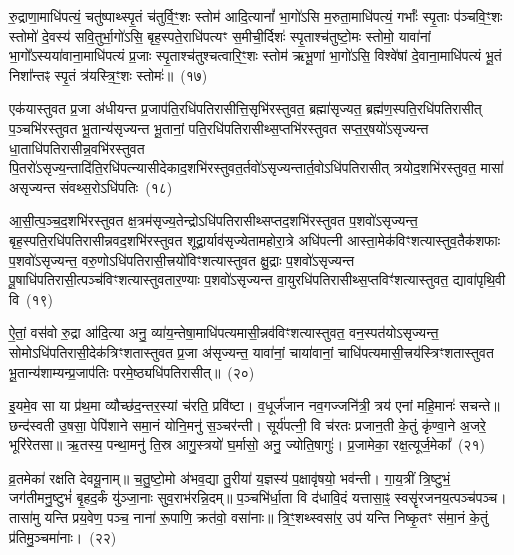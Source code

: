 रु॒द्राणा॒माधि॑पत्यं॒ चतु॑ष्पाथ्स्पृ॒तं च॑तुर्वि॒ꣳ॒शः स्तोम॑ आदि॒त्यानां᳚ भा॒गो॑\-ऽसि म॒रुता॒माधि॑पत्यं॒ गर्भाः᳚ स्पृ॒ताः प॑ञ्चवि॒ꣳ॒शः स्तोमो॑ दे॒वस्य॑ सवि॒तुर्भा॒गो॑\-ऽसि॒ बृह॒स्पते॒राधि॑पत्यꣳ स॒मीची॒र्दिशः॑ स्पृ॒ताश्च॑तुष्टो॒मः स्तोमो॒ यावा॑नां भा॒गो᳚\-ऽस्यया॑वाना॒माधि॑पत्यं प्र॒जाः स्पृ॒ताश्च॑तुश्चत्वारि॒ꣳ॒शः स्तोम॑ ऋभू॒णां भा॒गो॑\-ऽसि॒ विश्वे॑षां दे॒वाना॒माधि॑पत्यं भू॒तं निशा᳚न्तꣴ स्पृ॒तं त्र॑यस्त्रि॒ꣳ॒शः स्तोमः॑॥~(१७)

{\anuvakamend[{वसू॑नां भा॒गो॑\-ऽसि॒ षट्च॑त्वारिꣳशच्च}]}%

एक॑यास्तुवत प्र॒जा अ॑धीयन्त प्र॒जा\-प॑ति॒रधि॑पतिरासीत्ति॒सृभि॑रस्तुवत॒ ब्रह्मा॑सृज्यत॒ ब्रह्म॑ण॒स्पति॒रधि॑पतिरासीत् प॒ञ्चभि॑रस्तुवत भू॒तान्य॑सृज्यन्त भू॒तानां॒ पति॒रधि॑पतिरासीथ्स॒प्तभि॑रस्तुवत सप्त॒र्॒\mbox{}षयो॑\-ऽसृज्यन्त धा॒ताधि॑पतिरा\-सीन्न॒वभि॑रस्तुवत पि॒तरो॑\-ऽसृज्य॒न्तादि॑ति॒रधि॑पत्न्यासीदेकाद॒शभि॑रस्तुवत॒र्तवो॑\-ऽसृज्यन्तार्त॒वो\-ऽधि॑पतिरासीत् त्रयोद॒शभि॑रस्तुवत॒ मासा॑ असृज्यन्त संवथ्स॒रो\-ऽधि॑पतिः~(१८)

आ॒सी॒त्प॒ञ्च॒द॒शभि॑रस्तुवत क्ष॒त्रम॑सृज्य॒तेन्द्रो\-ऽधि॑पतिरासीथ्सप्तद॒शभि॑रस्तुवत प॒शवो॑\-ऽसृज्यन्त॒ बृह॒स्पति॒रधि॑पतिरासी\-न्नवद॒शभि॑रस्तुवत शूद्रा॒र्याव॑सृज्येतामहोरा॒त्रे अधि॑पत्नी आस्ता॒मेक॑विꣳशत्यास्तुव॒तैक॑शफाः प॒शवो॑\-ऽसृज्यन्त॒ वरु॒णो\-ऽधि॑पतिरासी॒त्त्रयो॑विꣳशत्यास्तुवत क्षु॒द्राः प॒शवो॑\-ऽसृज्यन्त पू॒षाधि॑पतिरासी॒त्पञ्च॑विꣳशत्यास्तुवतार॒ण्याः प॒शवो॑\-ऽसृज्यन्त वा॒युरधि॑पतिरासीथ्स॒प्तविꣳ॑शत्यास्तुवत॒ द्यावा॑पृथि॒वी वि~(१९)

ऐ॒तां॒ वस॑वो रु॒द्रा आ॑दि॒त्या अनु॒ व्या॑य॒न्तेषा॒माधि॑पत्यमासी॒न्नव॑विꣳशत्यास्तुवत॒ वन॒स्पत॑यो\-ऽसृज्यन्त॒ सोमो\-ऽ\-धि॑पतिरासी॒देक॑त्रिꣳशतास्तुवत प्र॒जा अ॑सृज्यन्त॒ यावा॑नां॒ चाया॑वानां॒ चाधि॑पत्यमासी॒त्त्रय॑स्त्रिꣳशतास्तुवत भू॒तान्य॑शाम्यन्प्र॒जा\-प॑तिः परमे॒ष्ठ्यधि॑पतिरासीत्॥~(२०)

{\anuvakamend[{सं॒ व॒थ्स॒रो\-ऽधि॑पति॒र्वि पञ्च॑त्रिꣳशच्च}]}%

इ॒यमे॒व सा या प्र॑थ॒मा व्यौच्छ॑द॒न्तर॒स्यां च॑रति॒ प्रवि॑ष्टा। व॒धूर्ज॑जान नव॒गज्जनि॑त्री॒ त्रय॑ एनां महि॒मानः॑ सचन्ते॥ छन्द॑स्वती उ॒षसा॒ पेपि॑शाने समा॒नं योनि॒मनु॑ स॒ञ्चर॑न्ती। सूर्य॑पत्नी॒ वि च॑रतः प्रजान॒ती के॒तुं कृ॑ण्वा॒ने अ॒जरे॒ भूरि॑रेतसा॥ ऋ॒तस्य॒ पन्था॒मनु॑ ति॒स्र आगु॒स्त्रयो॑ घ॒र्मासो॒ अनु॒ ज्योति॒षागुः॑। प्र॒जामेका॒ रक्ष॒त्यूर्ज॒मेका᳚~(२१)

व्र॒तमेका॑ रक्षति देवयू॒नाम्॥ च॒तु॒ष्टो॒मो अ॑भव॒द्या तु॒रीया॑ य॒ज्ञस्य॑ प॒क्षावृ॑षयो॒ भव॑न्ती। गा॒य॒त्रीं त्रि॒ष्टुभं॒ जग॑तीमनु॒ष्टुभं॑ बृ॒हद॒र्कं यु॑ञ्जा॒नाः सुव॒राभ॑रन्नि॒दम्॥ प॒ञ्चभि॑र्धा॒ता वि द॑धावि॒दं यत्तासा॒ꣴ॒ स्वसॄ॑रजनय॒त्पञ्च॑पञ्च। तासा॑मु यन्ति प्रय॒वेण॒ पञ्च॒ नाना॑ रू॒पाणि॒ क्रत॑वो॒ वसा॑नाः॥ त्रि॒ꣳ॒शथ्स्वसा॑र॒ उप॑ यन्ति निष्कृ॒तꣳ स॑मा॒नं के॒तुं प्र॑तिमु॒ञ्चमा॑नाः।~(२२)

